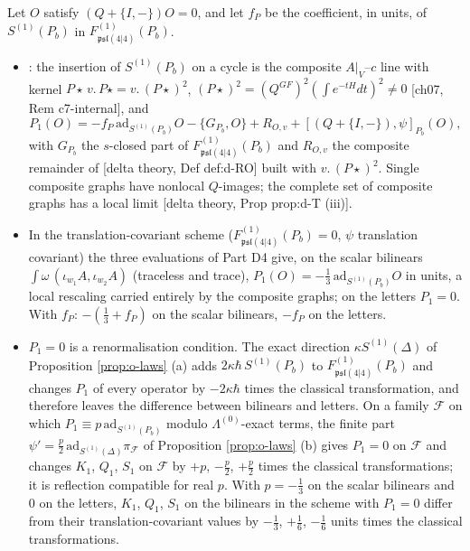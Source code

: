 \begin{proposition}[The translation component and the condition $P_1=0$]
\label{prop:o-P1}
Let $O$ satisfy $(Q+\{I,-\})O=0$, and let $f_P$ be the coefficient, in units, of $S^{(1)}(P_b)$ in $F^{(1)}_{\mathfrak{psl}(4|4)}(P_b)$.
\begin{itemize}
\item[(i)] [delta theory, Prop prop:d-P]: the insertion of $S^{(1)}(P_b)$ on a cycle is the composite $A|_V$--$c$ line with kernel $P\star\,v.\,P\star=v.\,(P\star)^2$, $(P\star)^2=(Q^{GF})^2(\int e^{-tH}dt)^2\neq0$ [ch07, Rem c7-internal], and
\[
P_1(O)=-f_P\,\mathrm{ad}_{S^{(1)}(P_b)}O-\{G_{P_b},O\}+R_{O,v}+[(Q+\{I,-\}),\psi]_{P_b}(O),
\]
with $G_{P_b}$ the $s$-closed part of $F^{(1)}_{\mathfrak{psl}(4|4)}(P_b)$ and $R_{O,v}$ the composite remainder of [delta theory, Def def:d-RO] built with $v.\,(P\star)^2$. Single composite graphs have nonlocal $Q$-images; the complete set of composite graphs has a local limit [delta theory, Prop prop:d-T (iii)].
\item[(ii)] In the translation-covariant scheme ($F^{(1)}_{\mathfrak{psl}(4|4)}(P_b)=0$, $\psi$ translation covariant) the three evaluations of Part D4 give, on the scalar bilinears $\int\omega\,(\iota_{w_1}A,\iota_{w_2}A)$ (traceless and trace), $P_1(O)=-\tfrac13\,\mathrm{ad}_{S^{(1)}(P_b)}O$ in units, a local rescaling carried entirely by the composite graphs; on the letters $P_1=0$. With $f_P$: $-(\tfrac13+f_P)$ on the scalar bilinears, $-f_P$ on the letters.
\item[(iii)] $P_1=0$ is a renormalisation condition. The exact direction $\kappa S^{(1)}(\Delta)$ of Proposition \ref{prop:o-laws} (a) adds $2\kappa\hbar\,S^{(1)}(P_b)$ to $F^{(1)}_{\mathfrak{psl}(4|4)}(P_b)$ and changes $P_1$ of every operator by $-2\kappa\hbar$ times the classical transformation, and therefore leaves the difference between bilinears and letters. On a family $\mathcal F$ on which $P_1\equiv p\,\mathrm{ad}_{S^{(1)}(P_b)}$ modulo $\Lambda^{(0)}$-exact terms, the finite part $\psi'=\tfrac p2\,\mathrm{ad}_{S^{(1)}(\Delta)}\pi_{\mathcal F}$ of Proposition \ref{prop:o-laws} (b) gives $P_1=0$ on $\mathcal F$ and changes $K_1$, $Q_1$, $S_1$ on $\mathcal F$ by $+p$, $-\tfrac p2$, $+\tfrac p2$ times the classical transformations; it is reflection compatible for real $p$. With $p=-\tfrac13$ on the scalar bilinears and $0$ on the letters, $K_1$, $Q_1$, $S_1$ on the bilinears in the scheme with $P_1=0$ differ from their translation-covariant values by $-\tfrac13$, $+\tfrac16$, $-\tfrac16$ units times the classical transformations.

\end{itemize}
\end{proposition}
